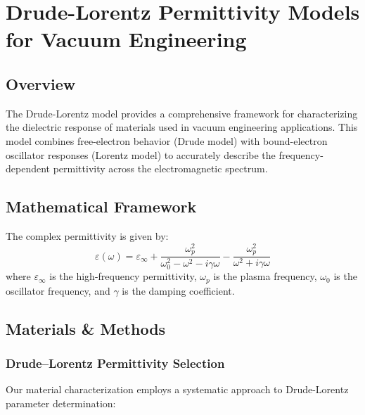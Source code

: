 \documentclass[11pt]{article}
\begin{document}
\section*{Drude-Lorentz Permittivity Models for Vacuum Engineering}

\subsection*{Overview}
The Drude-Lorentz model provides a comprehensive framework for characterizing the dielectric response of materials used in vacuum engineering applications. This model combines free-electron behavior (Drude model) with bound-electron oscillator responses (Lorentz model) to accurately describe the frequency-dependent permittivity across the electromagnetic spectrum.

\subsection*{Mathematical Framework}
The complex permittivity is given by:
\[
  \varepsilon(\omega) = \varepsilon_\infty + \frac{\omega_p^2}{\omega_0^2 - \omega^2 - i\gamma\omega} - \frac{\omega_p^2}{\omega^2 + i\gamma\omega}
\]
where $\varepsilon_\infty$ is the high-frequency permittivity, $\omega_p$ is the plasma frequency, $\omega_0$ is the oscillator frequency, and $\gamma$ is the damping coefficient.

\subsection*{Materials \& Methods}

\subsubsection*{Drude–Lorentz Permittivity Selection}
Our material characterization employs a systematic approach to Drude-Lorentz parameter determination:
\end{document}

